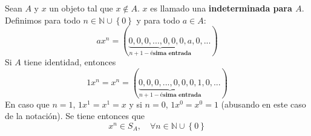 \documentclass[12pt]{report}
\theoremstyle{largebreak}
\begin{document}
    \begin{mydef}
        Sean $A$ y $x$ un objeto tal que $x\notin A$. $x$ es llamado una \textbf{indeterminada para $A$}. Definimos para todo $n\in\mathbb{N}\cup\left\{0\right\}$ y para todo $a\in A$:
        \begin{equation*}
            ax^n=(\underbrace{0,0,0,...,0,0,0,a}_{{n+1}-\textbf{ésima entrada}},0,...)
        \end{equation*}
        Si $A$ tiene identidad, entonces
        \begin{equation*}
            1x^n=x^n=(\underbrace{0,0,0,...,0,0,0,1}_{{n+1}-\textbf{ésima entrada}},0,...)
        \end{equation*}
        En caso que $n=1$, $1x^1=x^1=x$ y si $n=0$, $1x^0=x^0=1$ (abusando en este caso de la notación). Se tiene entonces que
        \begin{equation*}
            x^n\in S_A,\quad\forall n\in\mathbb{N}\cup\left\{0\right\}
        \end{equation*}
    \end{mydef}
\end{document}
